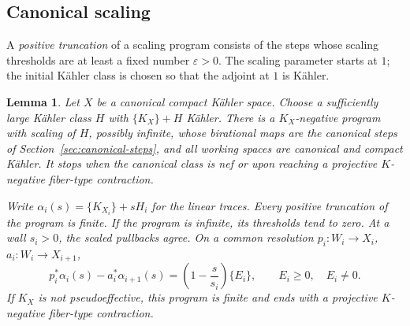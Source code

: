 \documentclass[11pt,a4paper]{article}
\numberwithin{equation}{section}
\newtheorem{lemma}[theorem]{Lemma}
\theoremstyle{definition}
\theoremstyle{remark}
\begin{document}
\subsection{Canonical scaling}

A \emph{positive truncation} of a scaling program consists of the
steps whose scaling thresholds are at least a fixed number
$\varepsilon>0$. The scaling parameter starts at $1$; the initial
Kähler class is chosen so that the adjoint at $1$ is Kähler.

\begin{lemma}\label{lem:canonical-scaling}
Let $X$ be a canonical compact Kähler space. Choose a sufficiently
large Kähler class $H$ with $\{K_X\}+H$ Kähler. There is a $K_X$-negative program with scaling of $H$, possibly
infinite, whose birational maps
are the canonical steps of Section~\ref{sec:canonical-steps}, and
all working spaces are canonical and compact Kähler. It stops
when the canonical class is nef or upon reaching a projective
$K$-negative fiber-type contraction.

Write $\alpha_i(s)=\{K_{X_i}\}+sH_i$ for the linear traces.
Every positive truncation of the program is finite. If the program
is infinite, its thresholds tend to zero. At a wall $s_i>0$,
the scaled pullbacks agree. On a common resolution
$p_i:W_i\to X_i$, $a_i:W_i\to X_{i+1}$,
\begin{equation}\label{eq:nonfactorial-wall}
 p_i^*\alpha_i(s)-a_i^*\alpha_{i+1}(s)
 =\left(1-\frac{s}{s_i}\right)\{E_i\},
 \qquad E_i\ge0,\quad E_i\ne0.
\end{equation}
If $K_X$ is not pseudoeffective, this program is finite and ends
with a projective $K$-negative fiber-type contraction.
\end{lemma}
\end{document}
